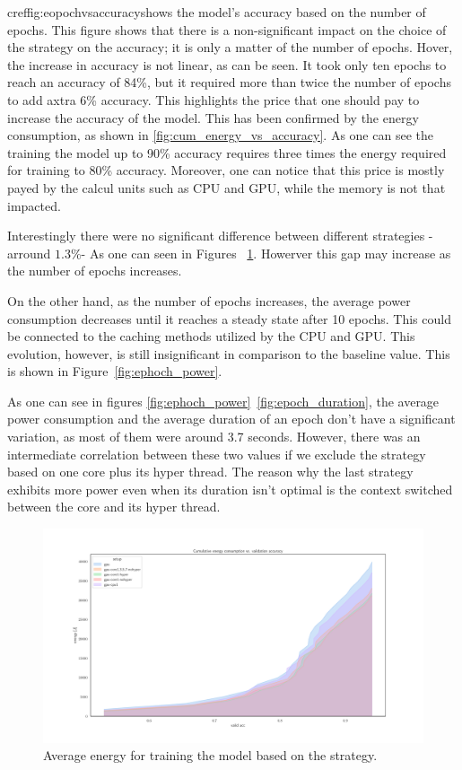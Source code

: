 cref{fig:eopochvsaccuracy}shows the model's accuracy based on the number of epochs. This figure shows that there is a non-significant impact on the choice of the strategy on the accuracy; it is only a matter of the number of epochs. Hover, the increase in accuracy is not linear, as can be seen. It took only ten epochs to reach an accuracy of 84\%, but it required more than twice the number of epochs to add axtra 6\% accuracy. This highlights the price that one should pay to increase the accuracy of the model. This has been confirmed by the energy consumption, as shown in \cref{fig:cum_energy_vs_accuracy}.
As one can see the training the model up to 90\% accuracy requires three times the energy required for training to 80\% accuracy. Moreover, one can notice that this price is mostly payed by the calcul units such as CPU and GPU, while the memory is not that impacted.

Interestingly there were no significant difference between different strategies -arround $1.3\%$- As one can seen in Figures ~\ref{fig:av_energy_setup}. Howerver this gap may increase as the number of epochs increases.

On the other hand, as the number of epochs increases, the average power consumption decreases until it reaches a steady state after 10 epochs. This could be connected to the caching methods utilized by the CPU and GPU. This evolution, however, is still insignificant in comparison to the baseline value. This is shown in Figure~\ref{fig:ephoch_power}.

As one can see in figures \ref{fig:ephoch_power}~\ref{fig:epoch_duration}, the average power consumption and the average duration of an epoch don't have a significant variation, as most of them were around 3.7 seconds. However, there was an intermediate correlation between these two values if we exclude the strategy based on one core plus its hyper thread. The reason why the last strategy exhibits more power even when its duration isn't optimal is the context switched between the core and its hyper thread.



\begin{figure}
    \centering
    \includegraphics[width=\linewidth]{imgs/cumulative_energy_fast10.pdf}
    \caption{Average energy for training the model based on the strategy.}
    \label{fig:av_energy_setup}
\end{figure}


